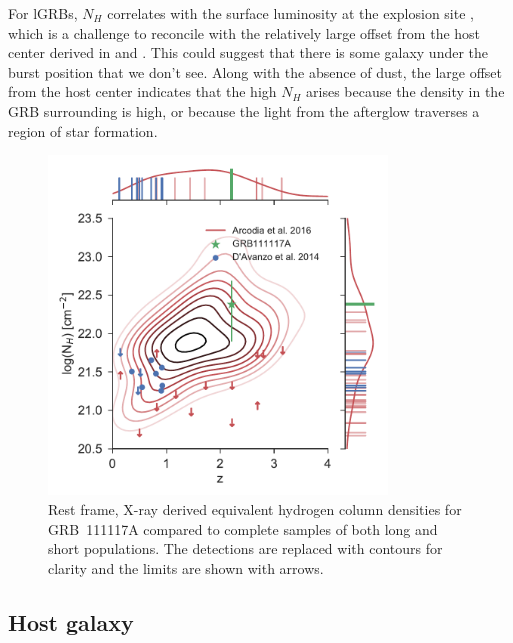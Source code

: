 \documentclass{aa}    %
\begin{document}
For lGRBs, $N_H$ correlates with the surface luminosity at the explosion site
\citep{Lyman2017}, which is a challenge to reconcile with the relatively large
offset from the host center derived in \citet{Margutti2012} and
\citet{Sakamoto2013}. This could suggest that there is some galaxy under the
burst position that we don’t see. Along with the absence of dust, the large
offset from the host center indicates that the high $N_H$ arises because the
density in the GRB surrounding is high, or because the light from the afterglow
traverses a region of star formation.

\begin{figure}
	\centering
	\includegraphics[width=9cm]{figures/NH_z.pdf}
	\caption{Rest frame, X-ray derived equivalent hydrogen column densities for GRB~111117A compared to complete samples of both long and short populations. The detections are replaced with contours for clarity and the limits are shown with arrows.}
	\label{fig:NH_z}
\end{figure}


\subsection{Host galaxy}
\end{document}
